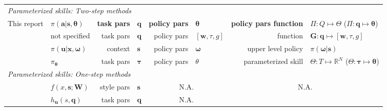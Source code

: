 \documentclass[12pt]{article}
\newcommand{\polg}   {\ensuremath{\Pi}}
\newcommand{\pol}    {\ensuremath{\pi}}
\newcommand{\act}    {\ensuremath{\mathbf{a}}}
\newcommand{\sta}    {\ensuremath{\mathbf{s}}}
\newcommand{\appsp}  {\ensuremath{\Theta}}
\newcommand{\taskp}  {\ensuremath{\mathbf{q}}}
\newcommand{\app}    {\ensuremath{\bm{\theta}}}
\newcommand{\taskpsp}{\ensuremath{Q}}
\begin{document}
\begin{table}[ht]
  \centering
\begin{scriptsize}
\begin{tabular}{|l|l|rl|rl|rl|}
\hline
\multicolumn{8}{|l|}{\em Parameterized skills: Two-step methods}\\
This report                          
& $\pol(\act|\sta,\app)$ 
& {\bf task pars}            & \taskp 
& {\bf policy pars}          & \app 
& {\bf policy pars function} & $\polg: \taskpsp \mapsto \appsp$ ($\polg: \taskp \mapsto \app$)\\  
\citet{ude10taskspecific}      
& not specified
& task pars            & $\mathbf{q}$ 
& policy pars          & $[\mathbf{w},\tau,g]$ 
& function             & $\mathbf{G}: \mathbf{q} \mapsto [\mathbf{w},\tau,g]$ \\  
\citet{kupcsik13dataefficient} 
& $\pi(\mathbf{u}|\mathbf{x},\mathbf{\omega})$ 
& context              & $\mathbf{s}$
& policy pars          & $\mathbf{\omega}$ 
& upper level policy   & $\pi(\mathbf{\omega}|\mathbf{s})$ \\  
\citet{silva12learning}        
& $\pi_\mathbf{\theta}$
& task pars            & $\mathbf{\tau}$ 
& policy pars          & ${\theta}$
& parameterized skill  & $\Theta: T \mapsto \mathbb{R}^N$ ($\Theta: \mathbf{\tau} \mapsto \mathbf{\theta}$)\\
\hline
\multicolumn{8}{|l|}{\em Parameterized skills: One-step methods}\\
\citet{matsubara11learning}    
& $f(x,\mathbf{s}; \mathbf{W})$
& style pars           & $\mathbf{s}$ 
& \multicolumn{2}{c|}{N.A.}   
& \multicolumn{2}{c|}{N.A.} \\  
\citet{stulp13learning}        
& $h_\mathbf{u}(s,\mathbf{q})$
& task pars            & $\mathbf{q}$ 
& \multicolumn{2}{c|}{N.A.}   

\end{tabular}
\end{scriptsize}
\end{table}
\end{document}
